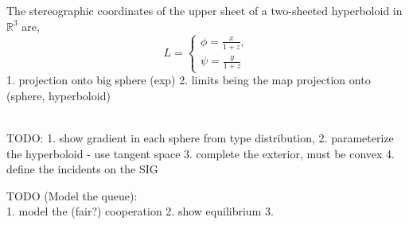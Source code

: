\documentclass[10pt]{article}
\theoremstyle{definition}
\begin{document}
The stereographic coordinates of the upper sheet of a two-sheeted hyperboloid
in $\mathbb{R}^3$ are,
$$
    L = 
    \begin{cases}
    \phi = \frac{x}{1+z},\\
    \psi = \frac{y}{1+z}
    \end{cases}
$$
1. projection onto big sphere (exp)
2. limits being the map projection onto (sphere, hyperboloid)


{\\ 
}
TODO: 
1. show gradient in each sphere from type distribution,
2. parameterize the hyperboloid
- use tangent space
3. complete the exterior, must be convex
4. define the incidents on the SIG

TODO (Model the queue):\\ %
1. model the (fair?) cooperation
2. show equilibrium
3. 
\end{document}

